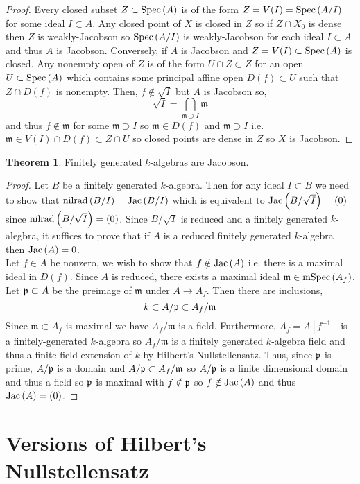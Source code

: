 \documentclass[12pt]{extarticle}
\theoremstyle{definition}
\newtheorem{theorem}{Theorem}[section]
\newcommand{\m}{\mathfrak{m}}
\begin{document}
\begin{proof}
Every closed subset $Z \subset \mathrm{Spec}\left(A\right)$ is of the form $Z = V(I) = \mathrm{Spec}\left(A / I\right)$ for some ideal $I \subset A$. Any closed point of $X$ is closed in $Z$ so if $Z \cap X_0$ is dense then $Z$ is weakly-Jacobson so $\mathrm{Spec}\left(A / I\right)$ is weakly-Jacobson for each ideal $I \subset A$ and thus $A$ is Jacobson. Conversely, if $A$ is Jacobson and $Z = V(I) \subset \mathrm{Spec}\left(A\right)$ is closed. Any nonempty open of $Z$ is of the form $U \cap Z \subset Z$ for an open $U \subset \mathrm{Spec}\left(A\right)$ which contains some principal affine open $D(f) \subset U$ such that $Z \cap D(f)$ is nonempty. Then, $f \notin \sqrt{I}$ but $A$ is Jacobson so,
\[ \sqrt{I} = \bigcap_{\m \supset I} \m \]
and thus $f \notin \m$ for some $\m \supset I$ so $\m \in D(f)$ and $\m \supset I$ i.e. $\m \in V(I) \cap D(f) \subset Z \cap U$ so closed points are dense in $Z$ so $X$ is Jacobson.
\end{proof}

\begin{theorem}
Finitely generated $k$-algebras are Jacobson.
\end{theorem}

\begin{proof}
Let $B$ be a finitely generated $k$-algebra. Then for any ideal $I \subset B$ we need to show that $\mathrm{nilrad}\left(B / I\right) = \mathrm{Jac}\left( B / I \right)$ which is equivalent to $\mathrm{Jac}\left( B / \sqrt{I} \right) = (0)$ since $\mathrm{nilrad}\left(B / \sqrt{I}\right) = (0)$. Since $B / \sqrt{I}$ is reduced and a finitely generated $k$-alegbra, it suffices to prove that if $A$ is a reduced finitely generated $k$-algebra then $\mathrm{Jac}\left( A \right) = 0$.
\bigskip\\
Let $f \in A$ be nonzero, we wish to show that $f \notin \mathrm{Jac}\left( A \right)$ i.e. there is a maximal ideal in $D(f)$. Since $A$ is reduced, there exists a maximal ideal $\m \in \mSpec{A_f}$. Let $\mathfrak{p} \subset A$ be the preimage of $\m$ under $A \to A_f$. Then there are inclusions,
\[ k \subset A / \p \subset A_f / \m \]
Since $\m \subset A_f$ is maximal we have $A_f / \m$ is a field. Furthermore, $A_f = A[f^{-1}]$ is a finitely-generated $k$-algebra so $A_f / \m$ is a finitely generated $k$-algebra field and thus a finite field extension of $k$ by Hilbert's Nullstellensatz. Thus, since $\mathfrak{p}$ is prime, $A / \mathfrak{p}$ is a domain and $A / \p \subset A_f / \m$ so $A / \mathfrak{p}$ is a finite dimensional domain and thus a field so $\mathfrak{p}$ is maximal with $f \notin \mathfrak{p}$ so $f \notin \mathrm{Jac}\left( A \right)$ and thus $\mathrm{Jac}\left( A \right) = (0)$. 
\end{proof}


\section{Versions of Hilbert's Nullstellensatz}
\end{document}
